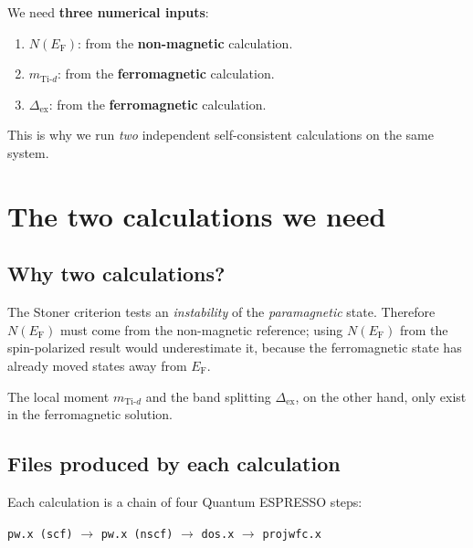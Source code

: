 \documentclass[11pt,a4paper]{article}
\newcommand{\Ef}{E_{\mathrm{F}}}
\newcommand{\Tid}{\text{Ti-}d}
\newcommand{\Dex}{\Delta_{\text{ex}}}
\newcommand{\NEf}{N(\Ef)}
\begin{document}
We need \textbf{three numerical inputs}:
%
\begin{enumerate}[label=(\alph*)]
    \item $\NEf$: from the \textbf{non-magnetic} calculation.
    \item $m_{\Tid}$: from the \textbf{ferromagnetic} calculation.
    \item $\Dex$: from the \textbf{ferromagnetic} calculation.
\end{enumerate}

This is why we run \emph{two} independent self-consistent calculations
on the same system.

\section{The two calculations we need}

\subsection{Why two calculations?}

The Stoner criterion tests an \emph{instability} of the
\emph{paramagnetic} state. Therefore $\NEf$ must come from the
non-magnetic reference; using $\NEf$ from the spin-polarized result
would underestimate it, because the ferromagnetic state has already
moved states away from $\Ef$.

The local moment $m_{\Tid}$ and the band splitting $\Dex$, on the other
hand, only exist in the ferromagnetic solution.

\subsection{Files produced by each calculation}

Each calculation is a chain of four Quantum ESPRESSO steps:
%
\begin{center}
\texttt{pw.x (scf)} $\to$ \texttt{pw.x (nscf)} $\to$ \texttt{dos.x} $\to$ \texttt{projwfc.x}
\end{center}
\end{document}

